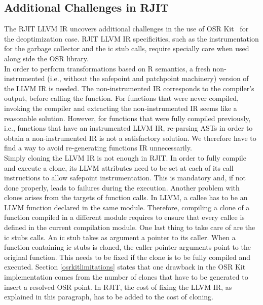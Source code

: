 \subsection{Additional Challenges in RJIT}\label{additionalchallenges}

The RJIT LLVM IR uncovers additional challenges in the use of OSR Kit~\cite{OSRKit} for the deoptimization case.
RJIT LLVM IR specificities, such as the instrumentation for the garbage collector and the ic stub calls, require specially care when used along side the OSR library.\\

In order to perform transformations based on R semantics, a fresh non-instrumented (i.e., without the safepoint and patchpoint machinery) version of the LLVM IR is needed.
The non-instrumented IR corresponds to the compiler's output, before calling the  function.
For functions that were never compiled, invoking the compiler and extracting the non-instrumented IR seems like a reasonable solution.
However, for functions that were fully compiled previously, i.e., functions that have an instrumented LLVM IR, re-parsing ASTs in order to obtain a non-instrumented IR is not a satisfactory solution.
We therefore have to find a way to avoid re-generating functions IR unnecessarily.\\

Simply cloning the LLVM IR is not enough in RJIT.
In order to fully compile and execute a clone, its LLVM attributes need to be set at each of its call instructions to allow safepoint instrumentation.
This is mandatory and, if not done properly, leads to failures during the execution.
Another problem with clones arises from the targets of function calls.
In LLVM, a callee has to be an LLVM function declared in the same module.
Therefore, compiling a clone of a function compiled in a different module requires to ensure that every callee is defined in the current compilation module.
One last thing to take care of are the ic stubs calls.
An ic stub takes as argument a pointer to its caller.
When a function containing ic stubs is cloned, the caller pointer arguments point to the original function.
This needs to be fixed if the clone is to be fully compiled and executed.
Section \ref{osrkitlimitations} states that one drawback in the OSR Kit implementation comes from the number of clones that have to be generated to insert a resolved OSR point.
In RJIT, the cost of fixing the LLVM IR, as explained in this paragraph, has to be added to the cost of cloning.\\

